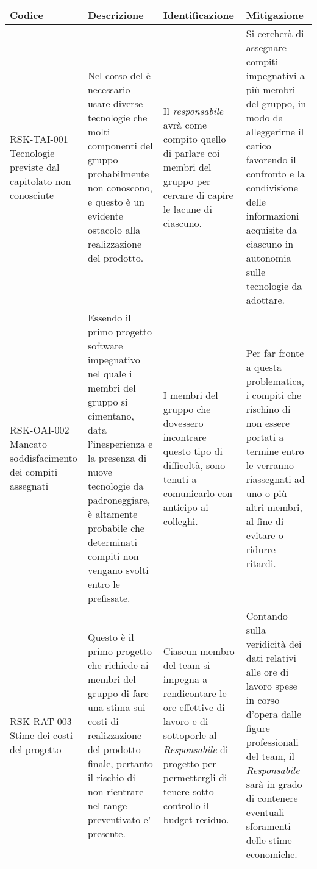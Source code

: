 \begin{center}
	\begin{longtable}{|p{3cm}|p{4cm}|p{3.5cm}|p{3.5cm}|}
	\hline
	\rowcolor{lighter-grayer}
	\textbf{Codice} & \textbf{Descrizione} & \textbf{Identificazione} & 
														\textbf{Mitigazione} \\
	\hline
	\endfirsthead


	\hline
	RSK-TAI-001 \newline Tecnologie previste dal capitolato non conosciute  & 
	Nel corso del \glock{processo di sviluppo}
	è necessario usare diverse tecnologie
	che molti componenti del gruppo probabilmente non conoscono, e questo è
	un evidente ostacolo alla realizzazione del prodotto.
	&  Il \textit{responsabile} avrà come compito quello di parlare coi membri
	   del gruppo per cercare di capire le lacune di ciascuno.
	 
	& Si cercherà di assegnare compiti impegnativi a più membri del gruppo,
	  in modo da alleggerirne il carico favorendo il confronto e la condivisione
	  delle informazioni acquisite da ciascuno in autonomia sulle tecnologie da adottare. \\
	\hline
	
		\hline
	RSK-OAI-002 \newline Mancato soddisfacimento dei compiti assegnati & 
	Essendo il primo progetto software impegnativo nel quale i membri del gruppo si cimentano, data l'inesperienza e la presenza di nuove tecnologie da padroneggiare, è altamente probabile che determinati compiti non vengano svolti entro le \glock{milestone} prefissate. 
	&  I membri del gruppo che dovessero incontrare questo tipo di difficoltà, sono tenuti a comunicarlo con anticipo ai colleghi.
	 
	& Per far fronte a questa problematica, i compiti che rischino di non essere portati a termine entro le \glock{milestone} verranno riassegnati ad uno o più altri membri, al fine di evitare o ridurre ritardi. \\
	\hline
	
		\hline
	RSK-RAT-003 \newline  Stime dei costi del progetto
	 & 
	Questo è il primo progetto che richiede ai membri del gruppo di fare una stima sui costi di realizzazione del prodotto finale, pertanto il rischio di non rientrare nel range preventivato e' presente.
	& 
	Ciascun membro del team si impegna a rendicontare le ore effettive di lavoro e di sottoporle al \textit{Responsabile} di progetto per permettergli di tenere sotto controllo il budget residuo.
	&
	Contando sulla veridicità dei dati relativi alle ore di lavoro spese in corso d'opera dalle figure professionali del team, il \textit{Responsabile} sarà in grado di contenere eventuali sforamenti delle stime economiche.	
	  \\
	\hline
	

\end{longtable}
\end{center}
